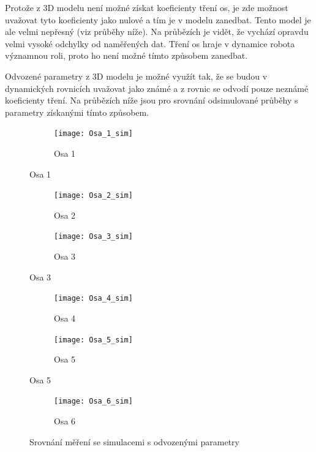 Protože z 3D modelu není možné získat koeficienty tření os, je zde možnost uvažovat tyto koeficienty jako nulové a tím je v modelu zanedbat. Tento model je ale velmi nepřesný (viz průběhy níže). Na průbězích je vidět, že vychází opravdu velmi vysoké odchylky od naměřených dat. Tření os hraje v dynamice robota významnou roli, proto ho není možné tímto způsobem zanedbat.

Odvozené parametry z 3D modelu je možné využít tak, že se budou v dynamických rovnicích uvažovat jako známé a z rovnic se odvodí pouze neznámé koeficienty tření. Na průbězích níže jsou pro srovnání odsimulované průběhy s parametry získanými tímto způsobem. 

\begin{figure}[h]
    \centering
    \begin{subfigure}[b]{1\textwidth}
        \texttt{[image: Osa\_1\_sim]}
        \caption{Osa 1}
        \label{osa_1_sim_pic}
        \end{subfigure}
\end{figure}
\begin{figure}\ContinuedFloat    
    \begin{subfigure}[b]{1\textwidth}
        \texttt{[image: Osa\_2\_sim]}
        \caption{Osa 2}
        \label{osa_2_sim_pic}
    \end{subfigure}
    \begin{subfigure}[b]{1\textwidth}
        \texttt{[image: Osa\_3\_sim]}
        \caption{Osa 3}
        \label{osa_3_sim_pic}
    \end{subfigure}
\end{figure}
\begin{figure}\ContinuedFloat
    \begin{subfigure}[b]{1\textwidth}
        \texttt{[image: Osa\_4\_sim]}
        \caption{Osa 4}
        \label{osa_4_sim_pic}
    \end{subfigure}
    \begin{subfigure}[b]{1\textwidth}
        \texttt{[image: Osa\_5\_sim]}
        \caption{Osa 5}
        \label{osa_5_sim_pic}
    \end{subfigure}
\end{figure}

\clearpage

\begin{figure}\ContinuedFloat
    \begin{subfigure}[b]{1\textwidth}
        \texttt{[image: Osa\_6\_sim]}
        \caption{Osa 6}
        \label{osa_6_sim_pic}
    \end{subfigure}
    \caption{Srovnání měření se simulacemi s odvozenými parametry}\label{osy_sim_pic}
\end{figure}

